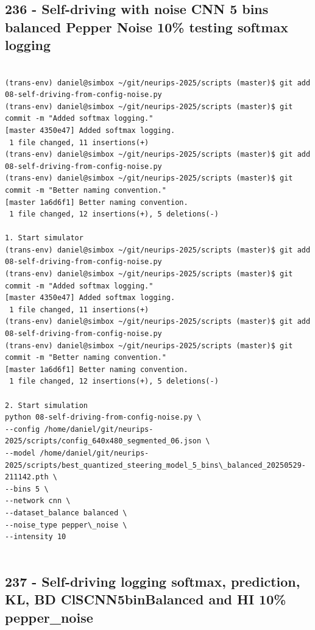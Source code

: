 \subsection{236 - Self-driving with noise CNN 5 bins balanced Pepper Noise 10\% testing softmax logging}
\label{app_res:236}

\begin{verbatim}

(trans-env) daniel@simbox ~/git/neurips-2025/scripts (master)$ git add 08-self-driving-from-config-noise.py 
(trans-env) daniel@simbox ~/git/neurips-2025/scripts (master)$ git commit -m "Added softmax logging."
[master 4350e47] Added softmax logging.
 1 file changed, 11 insertions(+)
(trans-env) daniel@simbox ~/git/neurips-2025/scripts (master)$ git add 08-self-driving-from-config-noise.py 
(trans-env) daniel@simbox ~/git/neurips-2025/scripts (master)$ git commit -m "Better naming convention."
[master 1a6d6f1] Better naming convention.
 1 file changed, 12 insertions(+), 5 deletions(-)

1. Start simulator
(trans-env) daniel@simbox ~/git/neurips-2025/scripts (master)$ git add 08-self-driving-from-config-noise.py 
(trans-env) daniel@simbox ~/git/neurips-2025/scripts (master)$ git commit -m "Added softmax logging."
[master 4350e47] Added softmax logging.
 1 file changed, 11 insertions(+)
(trans-env) daniel@simbox ~/git/neurips-2025/scripts (master)$ git add 08-self-driving-from-config-noise.py 
(trans-env) daniel@simbox ~/git/neurips-2025/scripts (master)$ git commit -m "Better naming convention."
[master 1a6d6f1] Better naming convention.
 1 file changed, 12 insertions(+), 5 deletions(-)

2. Start simulation 
python 08-self-driving-from-config-noise.py \
--config /home/daniel/git/neurips-2025/scripts/config_640x480_segmented_06.json \
--model /home/daniel/git/neurips-2025/scripts/best_quantized_steering_model_5_bins\_balanced_20250529-211142.pth \
--bins 5 \
--network cnn \
--dataset_balance balanced \
--noise_type pepper\_noise \
--intensity 10


\end{verbatim}

\subsection{237 - Self-driving logging softmax, prediction, KL, BD ClSCNN5binBalanced and HI 10\% pepper\_noise}
\label{app_res:237}

